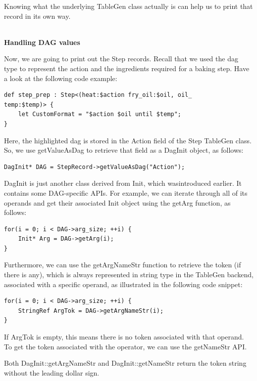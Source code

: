 Knowing what the underlying TableGen class actually is can help us to print that record in its own way.

\hspace*{\fill} \\ %
\noindent
\textbf{Handling DAG values}

Now, we are going to print out the Step records. Recall that we used the dag type to represent the action and the ingredients required for a baking step. Have a look at the following code example:

\begin{lstlisting}[style=styleCXX]
def step_prep : Step<(heat:$action fry_oil:$oil, oil_
temp:$temp)> {
	let CustomFormat = "$action $oil until $temp";
}
\end{lstlisting}

Here, the highlighted dag is stored in the Action field of the Step TableGen class. So, we use getValueAsDag to retrieve that field as a DagInit object, as follows:

\begin{lstlisting}[style=styleCXX]
DagInit* DAG = StepRecord->getValueAsDag("Action");
\end{lstlisting}

DagInit is just another class derived from Init, which wasintroduced earlier. It contains some DAG-specific APIs. For example, we can iterate through all of its operands and get their associated Init object using the getArg function, as follows:

\begin{lstlisting}[style=styleCXX]
for(i = 0; i < DAG->arg_size; ++i) {
	Init* Arg = DAG->getArg(i);
}
\end{lstlisting}

Furthermore, we can use the getArgNameStr function to retrieve the token (if there is any), which is always represented in string type in the TableGen backend, associated with a specific operand, as illustrated in the following code snippet:

\begin{lstlisting}[style=styleCXX]
for(i = 0; i < DAG->arg_size; ++i) {
	StringRef ArgTok = DAG->getArgNameStr(i);
}
\end{lstlisting}

If ArgTok is empty, this means there is no token associated with that operand. To get the token associated with the operator, we can use the getNameStr API.

\begin{tcolorbox}[colback=blue!5!white,colframe=blue!75!black, fonttitle=\bfseries,title=Note]
\hspace*{0.7cm}Both DagInit::getArgNameStr and DagInit::getNameStr return the token string without the leading dollar sign.
\end{tcolorbox}

